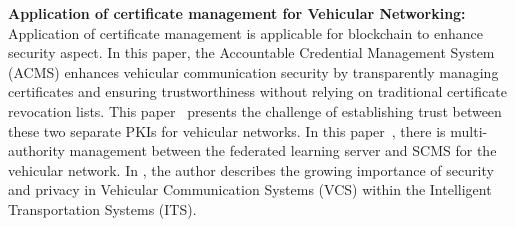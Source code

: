 \textbf{Application of certificate management for Vehicular Networking:} Application of certificate management is applicable for blockchain to enhance security aspect. In this paper\cite{khan2020accountable}, the Accountable Credential Management System (ACMS) enhances vehicular communication security by transparently managing certificates and ensuring trustworthiness without relying on traditional certificate revocation lists. This paper~\cite{byunx2023privacy} presents the challenge of establishing trust between these two separate PKIs for vehicular networks. In this paper~\cite{byun2024secure}, there is multi-authority management between the federated learning server and SCMS for the vehicular network. In \cite{lei2020blockchain}, the author describes the growing importance of security and privacy in Vehicular Communication Systems (VCS) within the Intelligent Transportation Systems (ITS).      

%